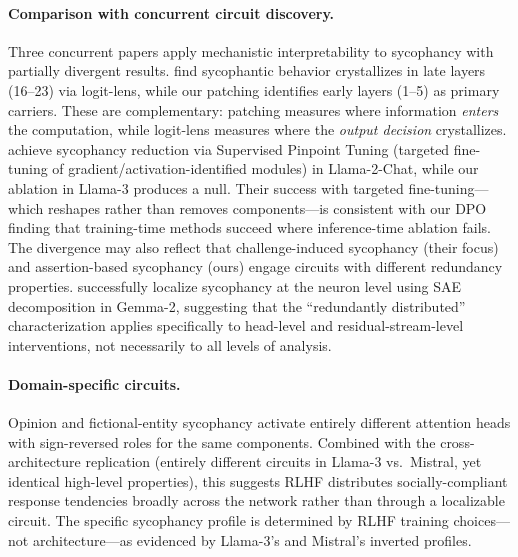 \documentclass{article}
\begin{document}
\paragraph{Comparison with concurrent circuit discovery.}
Three concurrent papers apply mechanistic interpretability to sycophancy with partially divergent results. \citet{li2025truth} find sycophantic behavior crystallizes in late layers (16--23) via logit-lens, while our patching identifies early layers (1--5) as primary carriers. These are complementary: patching measures where information \emph{enters} the computation, while logit-lens measures where the \emph{output decision} crystallizes. \citet{chen2024pinpoint} achieve sycophancy reduction via Supervised Pinpoint Tuning (targeted fine-tuning of gradient/activation-identified modules) in Llama-2-Chat, while our ablation in Llama-3 produces a null. Their success with targeted fine-tuning---which reshapes rather than removes components---is consistent with our DPO finding that training-time methods succeed where inference-time ablation fails. The divergence may also reflect that challenge-induced sycophancy (their focus) and assertion-based sycophancy (ours) engage circuits with different redundancy properties. \citet{obrien2026fewbad} successfully localize sycophancy at the neuron level using SAE decomposition in Gemma-2, suggesting that the ``redundantly distributed'' characterization applies specifically to head-level and residual-stream-level interventions, not necessarily to all levels of analysis.

\paragraph{Domain-specific circuits.}
Opinion and fictional-entity sycophancy activate entirely different attention heads with sign-reversed roles for the same components. Combined with the cross-architecture replication (entirely different circuits in Llama-3 vs.\ Mistral, yet identical high-level properties), this suggests RLHF distributes socially-compliant response tendencies broadly across the network rather than through a localizable circuit. The specific sycophancy profile is determined by RLHF training choices---not architecture---as evidenced by Llama-3's and Mistral's inverted profiles.
\end{document}
